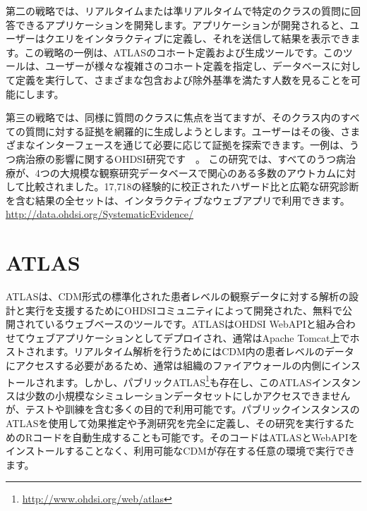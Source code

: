 \documentclass[
  11pt]{book}
\theoremstyle{definition}
\theoremstyle{definition}
\theoremstyle{definition}
\theoremstyle{definition}
\theoremstyle{remark}
\begin{document}
第二の戦略では、リアルタイムまたは準リアルタイムで特定のクラスの質問に回答できるアプリケーションを開発します。アプリケーションが開発されると、ユーザーはクエリをインタラクティブに定義し、それを送信して結果を表示できます。この戦略の一例は、ATLASのコホート定義および生成ツールです。このツールは、ユーザーが様々な複雑さのコホート定義を指定し、データベースに対して定義を実行して、さまざまな包含および除外基準を満たす人数を見ることを可能にします。

第三の戦略では、同様に質問のクラスに焦点を当てますが、そのクラス内のすべての質問に対する証拠を網羅的に生成しようとします。ユーザーはその後、さまざまなインターフェースを通じて必要に応じて証拠を探索できます。一例は、うつ病治療の影響に関するOHDSI研究です　\citep[ ]{schuemie_2018b}。 この研究では、すべてのうつ病治療が、4つの大規模な観察研究データベースで関心のある多数のアウトカムに対して比較されました。17,718の経験的に校正されたハザード比と広範な研究診断を含む結果の全セットは、インタラクティブなウェブアプリで利用できます。\url{http://data.ohdsi.org/SystematicEvidence/}\\

\section{ATLAS}\label{atlas}

ATLASは、CDM形式の標準化された患者レベルの観察データに対する解析の設計と実行を支援するためにOHDSIコミュニティによって開発された、無料で公開されているウェブベースのツールです。ATLASはOHDSI WebAPIと組み合わせてウェブアプリケーションとしてデプロイされ、通常はApache Tomcat上でホストされます。リアルタイム解析を行うためにはCDM内の患者レベルのデータにアクセスする必要があるため、通常は組織のファイアウォールの内側にインストールされます。しかし、パブリックATLAS\footnote{\url{http://www.ohdsi.org/web/atlas}}も存在し、このATLASインスタンスは少数の小規模なシミュレーションデータセットにしかアクセスできませんが、テストや訓練を含む多くの目的で利用可能です。パブリックインスタンスのATLASを使用して効果推定や予測研究を完全に定義し、その研究を実行するためのRコードを自動生成することも可能です。そのコードはATLASとWebAPIをインストールすることなく、利用可能なCDMが存在する任意の環境で実行できます。
\end{document}
